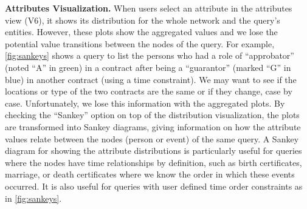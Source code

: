 
\textbf{Attributes Visualization.} When users select an attribute in the attributes view (V6), it shows its distribution for the whole network and the query's entities.  However, these plots show the aggregated values and we lose the potential value transitions between the nodes of the query.
For example, \autoref{fig:sankeys} shows a query to list the persons who had a role of ``approbator'' (noted ``A'' in green) in a contract after being a ``guarantor'' (marked ``G'' in blue) in another contract (using a time constraint). We may want to see if the locations or type of the two contracts are the same or if they change, case by case. Unfortunately, we lose this information with the aggregated plots. By checking the ``Sankey'' option on top of the distribution visualization, the plots are transformed into Sankey diagrams, giving information on how the attribute values relate between the nodes (person or event) of the same query.
A Sankey diagram for showing the attribute distributions is particularly useful for queries where the nodes have time relationships by definition, such as birth certificates, marriage, or death certificates where we know the order in which these events occurred. It is also useful for queries with user defined time order constraints as in \autoref{fig:sankeys}.





